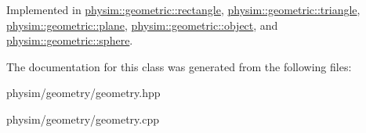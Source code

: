 Implemented in \hyperlink{classphysim_1_1geometric_1_1rectangle_a61fead9b22595c9d9be8dc3867e26717}{physim\+::geometric\+::rectangle}, \hyperlink{classphysim_1_1geometric_1_1triangle_ae2551793ce8a5de01504326309c1543b}{physim\+::geometric\+::triangle}, \hyperlink{classphysim_1_1geometric_1_1plane_aff9bd840500b32eeefb89ac0a7d9b95f}{physim\+::geometric\+::plane}, \hyperlink{classphysim_1_1geometric_1_1object_aa9f27d1cc4ee3a3b9883bd155435c2bc}{physim\+::geometric\+::object}, and \hyperlink{classphysim_1_1geometric_1_1sphere_a3c395dccc5e2c8995e28767419fe59d6}{physim\+::geometric\+::sphere}.



The documentation for this class was generated from the following files\+:\begin{DoxyCompactItemize}
\item 
physim/geometry/geometry.\+hpp\item 
physim/geometry/geometry.\+cpp\end{DoxyCompactItemize}
